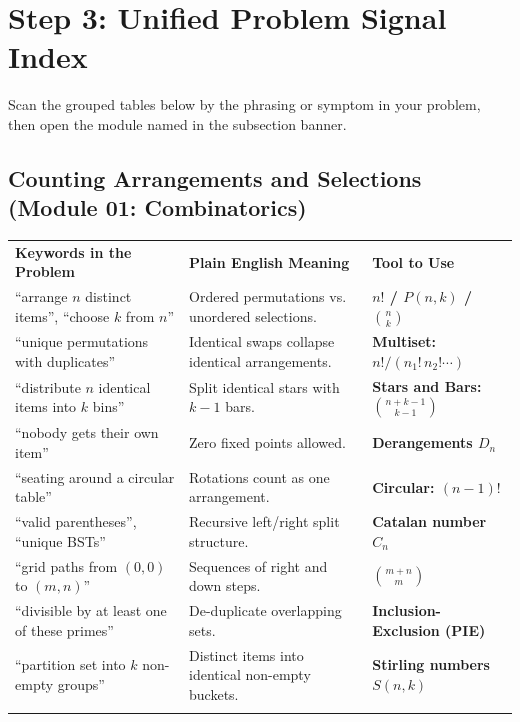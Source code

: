 \documentclass[11pt,a4paper]{article}
\begin{document}
\section{Step 3: Unified Problem Signal Index}
\label{sec:index}

Scan the grouped tables below by the phrasing or symptom in your problem, then open the module named in the subsection banner.

\subsection{Counting Arrangements and Selections (Module 01: Combinatorics)}
\begingroup\footnotesize{}
\begin{tabularx}{\textwidth}{>{\raggedright\arraybackslash}p{4.4cm} >{\raggedright\arraybackslash}X >{\raggedright\arraybackslash\bfseries}p{4.0cm}}
\arrayrulecolor{primaryblue}\toprule[1.1pt]
\rowcolor{primaryblue!10}
\textcolor{primaryblue}{\textbf{Keywords in the Problem}} & \textcolor{primaryblue}{\textbf{Plain English Meaning}} & \textcolor{primaryblue}{\textbf{Tool to Use}} \\
\arrayrulecolor{codeframe}\midrule[0.6pt]
``arrange $n$ distinct items'', ``choose $k$ from $n$'' & Ordered permutations vs. unordered selections. & $n!$ / $P(n,k)$ / $\binom{n}{k}$ \\
``unique permutations with duplicates'' & Identical swaps collapse identical arrangements. & Multiset: $n! / (n_1!\,n_2!\cdots)$ \\
``distribute $n$ identical items into $k$ bins'' & Split identical stars with $k-1$ bars. & Stars and Bars: $\binom{n+k-1}{k-1}$ \\
``nobody gets their own item'' & Zero fixed points allowed. & Derangements $D_n$ \\
``seating around a circular table'' & Rotations count as one arrangement. & Circular: $(n-1)!$ \\
``valid parentheses'', ``unique BSTs'' & Recursive left/right split structure. & Catalan number $C_n$ \\
``grid paths from $(0,0)$ to $(m,n)$'' & Sequences of right and down steps. & $\binom{m+n}{m}$ \\
``divisible by at least one of these primes'' & De-duplicate overlapping sets. & Inclusion-Exclusion (PIE) \\
``partition set into $k$ non-empty groups'' & Distinct items into identical non-empty buckets. & Stirling numbers $S(n,k)$ \\
\arrayrulecolor{primaryblue}\bottomrule[1.1pt]
\end{tabularx}\endgroup
\end{document}
